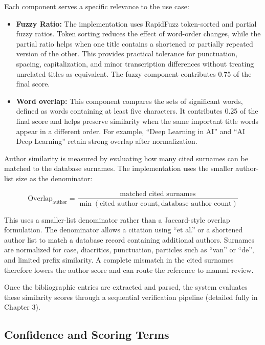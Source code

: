 \documentclass[12pt,a4paper,oneside]{report}
\begin{document}
Each component serves a specific relevance to the use case:
\begin{itemize}
    \item \textbf{Fuzzy Ratio:} The implementation uses RapidFuzz token-sorted and partial fuzzy ratios. Token sorting reduces the effect of word-order changes, while the partial ratio helps when one title contains a shortened or partially repeated version of the other. This provides practical tolerance for punctuation, spacing, capitalization, and minor transcription differences without treating unrelated titles as equivalent. The fuzzy component contributes 0.75 of the final score.
    \item \textbf{Word overlap:} This component compares the sets of significant words, defined as words containing at least five characters. It contributes 0.25 of the final score and helps preserve similarity when the same important title words appear in a different order. For example, ``Deep Learning in AI'' and ``AI Deep Learning'' retain strong overlap after normalization.
\end{itemize}

Author similarity is measured by evaluating how many cited surnames can be matched to the database surnames. The implementation uses the smaller author-list size as the denominator:

\begin{equation}
\text{Overlap}_{\text{author}} = \frac{\text{matched cited surnames}}{\min(\text{cited author count},\text{database author count})}
\end{equation}

This uses a smaller-list denominator rather than a Jaccard-style overlap formulation. The denominator allows a citation using ``et al.'' or a shortened author list to match a database record containing additional authors. Surnames are normalized for case, diacritics, punctuation, particles such as ``van'' or ``de'', and limited prefix similarity. A complete mismatch in the cited surnames therefore lowers the author score and can route the reference to manual review.

Once the bibliographic entries are extracted and parsed, the system evaluates these similarity scores through a sequential verification pipeline (detailed fully in Chapter 3). 

\subsection{Confidence and Scoring Terms}
\end{document}
